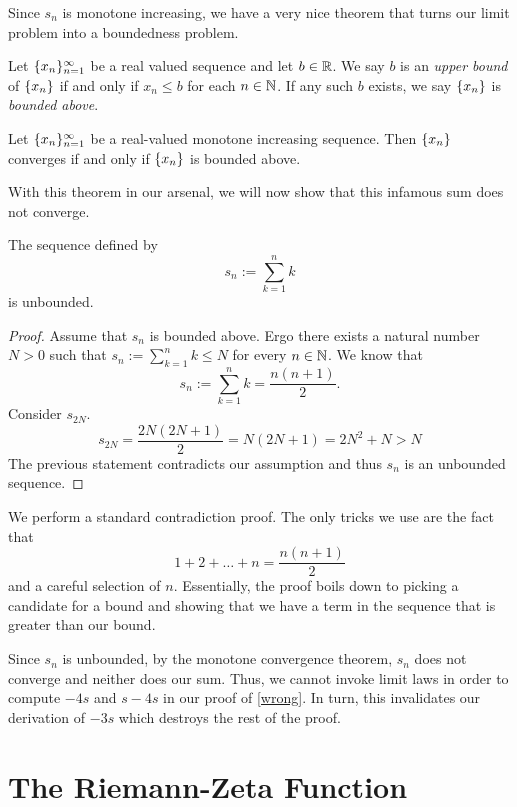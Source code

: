\documentclass[]{simple}
\begin{document}
Since $s_n$ is monotone increasing, we have a very nice theorem that turns our limit problem into a boundedness problem.

\begin{definition}
	Let $\lbrace x_n \rbrace_{n=1}^\infty$ be a real valued sequence and let $b\in\mathbb{R}$.
	We say $b$ is an \textit{upper bound} of $\lbrace x_n \rbrace$ if and only if $x_n\leq b$ for each $n\in\mathbb{N}$.
	If any such $b$ exists, we say $\lbrace x_n \rbrace$ is \textit{bounded above}.
\end{definition}

\begin{thm}
	Let $\lbrace x_n \rbrace_{n=1}^\infty$ be a real-valued monotone increasing sequence. Then $\lbrace x_n \rbrace$ converges if and only if $\lbrace x_n \rbrace$ is bounded above.
\end{thm}

With this theorem in our arsenal, we will now show that this infamous sum does not converge.

\begin{proposition}
	The sequence defined by
	\[
		s_n:=\sum_{k=1}^n k
	\]
	is unbounded.
\end{proposition}
\begin{proof}
Assume that $s_n$ is bounded above.
Ergo there exists a natural number $N > 0$ such that $s_n:=\sum_{k=1}^n k \leq N$ for every $n\in\mathbb{N}$.
We know that
\[
	s_n:=\sum_{k=1}^n k = \frac{n(n+1)}{2}.
\]
Consider $s_{2N}$.
\[
	s_{2N} = \frac{2N(2N+1)}{2}=N(2N+1)=2N^2+N>N
\]
The previous statement contradicts our assumption and thus $s_n$ is an unbounded sequence.
\end{proof}
\begin{analysis}
	We perform a standard contradiction proof.
	The only tricks we use are the fact that
	\[
		1+2+\ldots+n=\frac{n(n+1)}{2}
	\]
	and a careful selection of $n$.
	Essentially, the proof boils down to picking a candidate for a bound and showing that we have a term in the sequence that is greater than our bound.
\end{analysis}

Since $s_n$ is unbounded, by the monotone convergence theorem, $s_n$ does not converge and neither does our sum.
Thus, we cannot invoke limit laws in order to compute $-4s$ and $s-4s$ in our proof of \autoref{wrong}.
In turn, this invalidates our derivation of $-3s$ which destroys the rest of the proof.

\section{The Riemann-Zeta Function}
\end{document}
